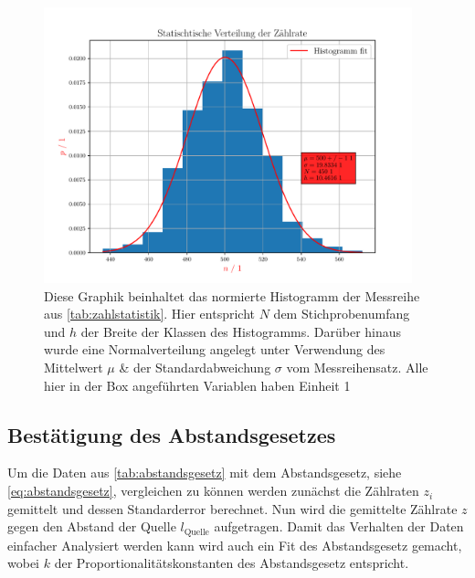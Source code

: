 \documentclass[12pt,english,ngerman]{scrartcl}
\begin{document}
\begin{figure}[H]
	\begin{center}
		\includegraphics[width=0.95\textwidth]{./figures/10statistik.pdf}
	\end{center}
	\caption[Histogramm der Zählstatistik mit Klassen der Größe 10]{Diese Graphik
		beinhaltet das normierte Histogramm der Messreihe aus
		\autoref{tab:zahlstatistik}. Hier entspricht $N$ dem Stichprobenumfang und
		$h$ der Breite der Klassen des Histogramms. Darüber hinaus wurde eine
		Normalverteilung angelegt unter Verwendung des Mittelwert $\mu$ \& der
		Standardabweichung $\sigma$ vom Messreihensatz. Alle hier in der Box
		angeführten Variablen haben Einheit 1}\label{fig:10statistik}
\end{figure}

\subsection{Bestätigung des Abstandsgesetzes}

Um die Daten aus \autoref{tab:abstandsgesetz} mit dem Abstandsgesetz, siehe
\autoref{eq:abstandsgesetz}, vergleichen zu können werden zunächst die
Zählraten $z_i$ gemittelt und dessen Standarderror berechnet. Nun wird die
gemittelte Zählrate $z$ gegen den Abstand der Quelle $l_{\mathrm{Quelle}}$
aufgetragen. Damit das Verhalten der Daten einfacher Analysiert werden kann
wird auch ein Fit des Abstandsgesetz gemacht, wobei $k$ der
Proportionalitätskonstanten des Abstandsgesetz entspricht.
\end{document}
